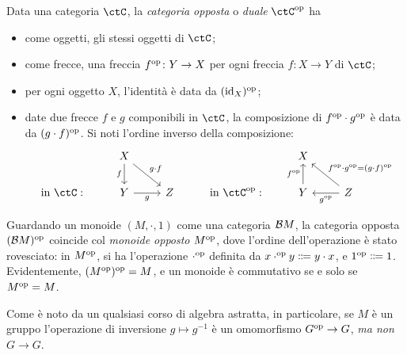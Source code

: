 \begin{definition}\label{def_cat_opp}
 Data una categoria \(\ctC\), la \emph{categoria opposta} o \emph{duale} \(\ctC^\op\) ha
 \begin{itemize}
  \item come oggetti, gli stessi oggetti di \(\ctC\);
  \item come frecce, una freccia \(f^{\text{op}}\colon Y\to X\) per ogni freccia \(f\colon X\to Y\) di \(\ctC\);
  \item per ogni oggetto \(X\), l'identità è data da \((\mathrm{id}_X)^{\text{op}}\);
  \item date due frecce \(f\) e \(g\) componibili in \(\ctC\), la composizione di \(f^{\text{op}}\cdot g^{\text{op}}\) è data da \((g\cdot f)^{\text{op}}\). Si noti l'ordine inverso della composizione:
        \[\begin{tikzcd}
          & X &&& X \\
          {\text{in }\ctC:} & Y & Z & {\text{in }\ctC^\op:} & Y & Z
          \arrow["f"', from=1-2, to=2-2]
          \arrow["g"', from=2-2, to=2-3]
          \arrow["{g^\op}", from=2-6, to=2-5]
          \arrow["{f^\op}", from=2-5, to=1-5]
          \arrow["{g\cmp f}", from=1-2, to=2-3]
          \arrow["{f^\op\cmp g^\op = (g\cmp f)^\op}"', from=2-6, to=1-5]
         \end{tikzcd}\]
 \end{itemize}
\end{definition}
\begin{example}\label{mon_opposti_cat_opposte}
 Guardando un monoide \((M,\cdot,1)\) come una categoria \(\mathcal{B} M\), la categoria opposta \((\mathcal{B} M)^{\text{op}}\) coincide col \emph{monoide opposto} \(M^{\text{op}}\), dove l'ordine dell'operazione è stato rovesciato: in \(M^{\text{op}}\), si ha l'operazione \(\cdot^{\text{op}}\) definita da \(x\cdot^\op y \defeq y\cdot x\), e \(1^\op \defeq 1\). Evidentemente, \((M^{\text{op}})^{\text{op}} = M\), e un monoide è commutativo se e solo se \(M^{\text{op}}=M\).

 Come è noto da un qualsiasi corso di algebra astratta, in particolare, se \(M\) è un gruppo l'operazione di inversione \(g\mapsto g^{-1}\) è un omomorfismo \(G^{\text{op}}\to G\), \emph{ma non} \(G\to G\).
\end{example}
